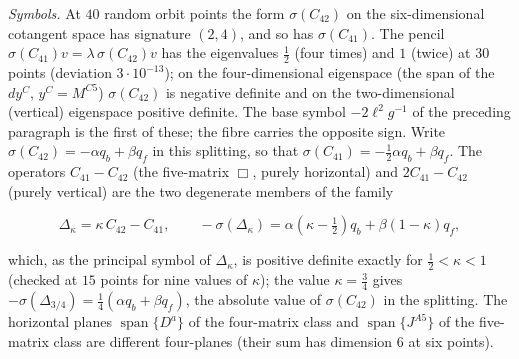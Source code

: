 \emph{Symbols.} At \(40\) random orbit points the form \(\sigma(C_{42})\) on the six-dimensional cotangent space has signature \((2,4)\), and so has \(\sigma(C_{41})\). The pencil \(\sigma(C_{41})v=\lambda\,\sigma(C_{42})v\) has the eigenvalues \(\tfrac12\) (four times) and \(1\) (twice) at \(30\) points (deviation \(3\cdot10^{-13}\)); on the four-dimensional eigenspace (the span of the \(dy^C\), \(y^C=M^{C5}\)) \(\sigma(C_{42})\) is negative definite and on the two-dimensional (vertical) eigenspace positive definite. The base symbol \(-2\ell^2g^{-1}\) of the preceding paragraph is the first of these; the fibre carries the opposite sign. Write \(\sigma(C_{42})=-\alpha q_b+\beta q_f\) in this splitting, so that \(\sigma(C_{41})=-\tfrac12\alpha q_b+\beta q_f\). The operators \(C_{41}-C_{42}\) (the five-matrix \(\Box\), purely horizontal) and \(2C_{41}-C_{42}\) (purely vertical) are the two degenerate members of the family

\[

\Delta_\kappa=\kappa\,C_{42}-C_{41},\qquad -\sigma(\Delta_\kappa)=\alpha(\kappa-\tfrac12)q_b+\beta(1-\kappa)q_f ,

\]

which, as the principal symbol of \(\Delta_\kappa\), is positive definite exactly for \(\tfrac12<\kappa<1\) (checked at \(15\) points for nine values of \(\kappa\)); the value \(\kappa=\tfrac34\) gives \(-\sigma(\Delta_{3/4})=\tfrac14(\alpha q_b+\beta q_f)\), the absolute value of \(\sigma(C_{42})\) in the splitting. The horizontal planes \(\operatorname{span}\{D^a\}\) of the four-matrix class and \(\operatorname{span}\{J^{A5}\}\) of the five-matrix class are different four-planes (their sum has dimension \(6\) at six points).



